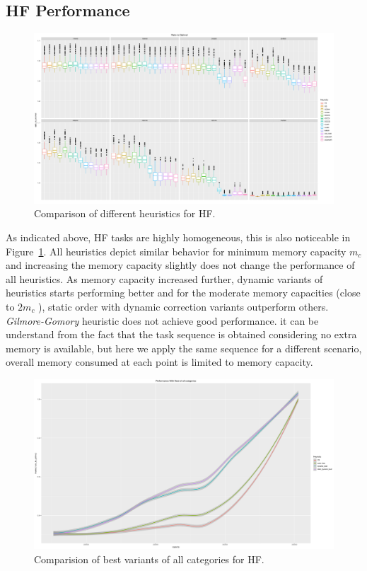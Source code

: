 \documentclass[runningheads]{llncs} %
\begin{document}
\subsection{HF Performance}	
	\begin{figure}[htb]
		\includegraphics[scale=0.225]{./results/plots/ratio_to_optimal_selected_hf.pdf}
		\caption{Comparison of different heuristics for HF.}
		\label{fig:ratio_to_optimal_hf}
	\end{figure}
 As indicated above, HF tasks are highly homogeneous, this is also noticeable in Figure~\ref{fig:ratio_to_optimal_hf}. All heuristics depict similar behavior for minimum memory capacity $m_c$  and  increasing the memory capacity slightly does not change the performance of all heuristics. As memory capacity increased further, dynamic variants of heuristics starts performing better and for the moderate memory capacities (close to $2m_c$ ), static order with dynamic correction variants outperform others. \textit{Gilmore-Gomory} heuristic does not achieve good performance. it can be understand from the fact that the task sequence is obtained considering no extra memory is available, but here we apply the same sequence for a different scenario,  overall memory consumed at each point is limited to memory capacity.


	\begin{figure}[htb]
	\includegraphics[scale=0.225]{./results/plots/inverse_ratio_to_optimal_hf-best.pdf}
	\caption{Comparision of best variants of all categories for HF.}
	\label{fig:ratio_to_optimal_best_hf}
	\end{figure}
\end{document}
